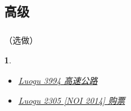\documentclass[9pt, UTF8]{beamer} %
\newcommand \fts {\frametitle{\insertsubsection}}
\newtheorem*{bbox}{}
\begin{document}
	\subsection{高级}

	\begin{frame}
		\fts

		（选做）

		\bigskip

		\begin{bbox}
			\begin{itemize}

				\item \href {https://www.luogu.org/problemnew/show/P3994} {Luogu 3994 高速公路}

				\item \href {https://www.luogu.org/problemnew/show/P2305} {Luogu 2305 [NOI 2014] 购票}

			\end{itemize}
		\end{bbox}

	\end{frame}
\end{document}
